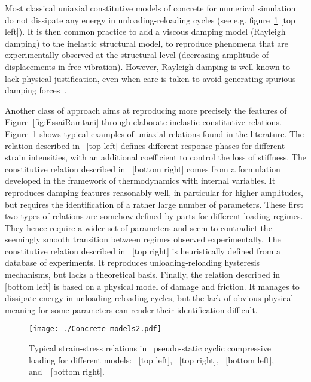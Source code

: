 \documentclass[12p]{amsart}
\begin{document}
Most classical uniaxial constitutive models of concrete for numerical simulation do not dissipate any energy in unloading-reloading cycles (see e.g. figure~\ref{fig:con-mod} [top left]). It is then common practice to add a viscous damping model (Rayleigh damping) to the inelastic structural model, to reproduce phenomena that are experimentally observed at the structural level (decreasing amplitude of displacements in free vibration). However, Rayleigh damping is well known to lack physical justification, even when care is taken to avoid generating spurious damping forces~\cite{Charney2008, Hall2006}.

Another class of approach aims at reproducing more precisely the features of Figure~\ref{fig:EssaiRamtani} through elaborate inelastic constitutive relations. Figure~\ref{fig:con-mod} shows typical examples of uniaxial relations found in the literature. The relation described in~\cite{Perform3D} [top left] defines different response phases for different strain intensities, with an additional coefficient to control the loss of stiffness. The constitutive relation described in~\cite{Jeh-et-al2010} [bottom right] comes from a formulation developed in the framework of thermodynamics with internal variables. It reproduces damping features reasonably well, in particular for higher amplitudes, but requires the identification of a rather large number of parameters. These first two types of relations are somehow defined by parts for different loading regimes. They hence require a wider set of parameters and seem to contradict the seemingly smooth transition between regimes observed experimentally. The constitutive relation described in~\cite{Vector2} [top right] is heuristically defined from a database of experiments. It reproduces unloading-reloading hysteresis mechanisms, but lacks a theoretical basis. Finally, the relation described in~\cite{RagLaBMaz2000} [bottom left] is based on a physical model of damage and friction. It manages to dissipate energy in unloading-reloading cycles, but the lack of obvious physical meaning for some parameters can render their identification difficult.

\begin{figure}[htb]
\centering
\texttt{[image: ./Concrete-models2.pdf]}
\caption{Typical strain-stress relations in \ pseudo-static cyclic compressive loading for different models: \cite{Perform3D}~[top left], \cite{Vector2}~[top right], \cite{RagLaBMaz2000}~[bottom left], and~\cite{Jeh-et-al2010}~[bottom right].}
\label{fig:con-mod}
\end{figure}
\end{document}
